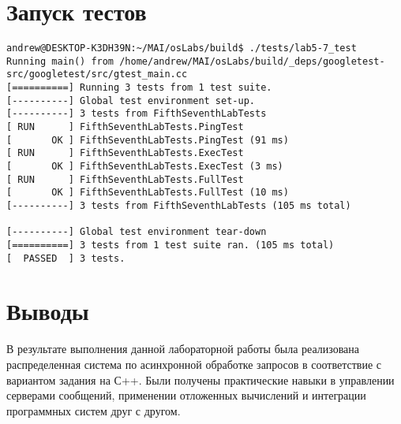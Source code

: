 \documentclass[a4paper, 12pt]{article}
\begin{document}
\section{Запуск тестов}
\begin{verbatim}
andrew@DESKTOP-K3DH39N:~/MAI/osLabs/build$ ./tests/lab5-7_test 
Running main() from /home/andrew/MAI/osLabs/build/_deps/googletest-src/googletest/src/gtest_main.cc
[==========] Running 3 tests from 1 test suite.
[----------] Global test environment set-up.
[----------] 3 tests from FifthSeventhLabTests
[ RUN      ] FifthSeventhLabTests.PingTest
[       OK ] FifthSeventhLabTests.PingTest (91 ms)
[ RUN      ] FifthSeventhLabTests.ExecTest
[       OK ] FifthSeventhLabTests.ExecTest (3 ms)
[ RUN      ] FifthSeventhLabTests.FullTest
[       OK ] FifthSeventhLabTests.FullTest (10 ms)
[----------] 3 tests from FifthSeventhLabTests (105 ms total)

[----------] Global test environment tear-down
[==========] 3 tests from 1 test suite ran. (105 ms total)
[  PASSED  ] 3 tests.
\end{verbatim}
\newpage

\section{Выводы}

В результате выполнения данной лабораторной работы была реализована распределенная система по асинхронной обработке запросов в соответствие с вариантом задания на С++. Были получены практические навыки в управлении серверами сообщений, применении отложенных вычислений и интеграции программных систем друг с другом.
\end{document}
